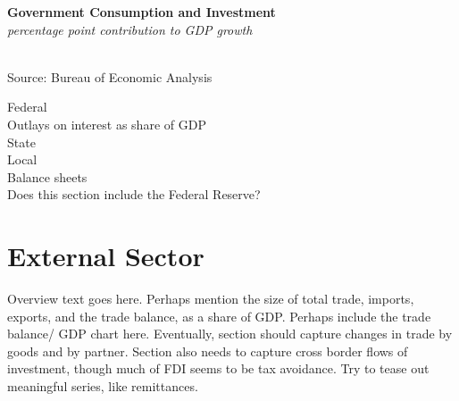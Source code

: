 \documentclass{report}
\makeatletter
\newcommand*\short[1]{\expandafter\@gobbletwo\number\numexpr#1\relax}
\newcommand{\sbar}[4]{
		\addplot[ybar stacked, bar width=2.7pt, draw opacity=0, fill=#1] 
			table [x=#2, y=#3, col sep=comma]{#4};}
\newcommand{\dateaxisticks}{
		date coordinates in=x, axis line style={draw=none},
		xmax={2019-10-01},
		max space between ticks=40,	    
		xtick={{1990-01-01}, {1992-01-01}, {1994-01-01}, 
			{1996-01-01}, {1998-01-01}, {2000-01-01}, 
			{2002-01-01}, {2004-01-01}, {2006-01-01},
			{2008-01-01}, {2010-01-01}, {2012-01-01}, {2014-01-01},
		    {2016-01-01}, {2018-01-01}},
		minor xtick={{1989-01-01}, {1991-01-01}, {1993-01-01},
			{1995-01-01}, {1997-01-01}, {1999-01-01}, 
			{2001-01-01}, {2003-01-01}, {2005-01-01}, {2007-01-01},
		    {2009-01-01}, {2011-01-01}, {2013-01-01}, {2015-01-01},
		    {2017-01-01}, {2019-01-01}},
		enlarge y limits={0.04}, enlarge x limits={0.01},
		}
\newcommand{\bbar}[2]{extra #1 ticks = {{#2}}, extra #1 tick labels = ,
		extra #1 tick style = {grid=major, grid style={thick, black!25}},}
\newcommand{\rbars}{
		\fill[color=black!10] (axis cs:{1990-07-01},\pgfkeysvalueof{/pgfplots/ymin}) rectangle 
			(axis cs:{1991-03-01}, \pgfkeysvalueof{/pgfplots/ymax});
		\fill[color=black!10] (axis cs:{2007-12-01},\pgfkeysvalueof{/pgfplots/ymin}) rectangle 
			(axis cs:{2009-07-01}, \pgfkeysvalueof{/pgfplots/ymax});
		\fill[color=black!10] (axis cs:{2001-03-01},\pgfkeysvalueof{/pgfplots/ymin}) rectangle 
			(axis cs:{2001-11-01}, \pgfkeysvalueof{/pgfplots/ymax});}
\makeatother
\begin{document}
{{{\begin{minipage}{0.76\textwidth}
\noindent \normalsize \textbf{Government Consumption and Investment}\\
\footnotesize{\textit{percentage point contribution to GDP growth}}\\
\noindent \hspace*{-2mm} \\
\footnotesize{Source: Bureau of Economic Analysis}
\vspace{10mm}

\normalsize

Federal\\

\hspace{5mm} Outlays on interest as share of GDP \\

State \\

Local \\

Balance sheets \\

Does this section include the Federal Reserve?\\

\end{minipage}


\newpage
\begin{minipage}{0.76\textwidth}
\section*{\color{darkgray}\LARGE \seriffont External Sector}

\small

Overview text goes here. Perhaps mention the size of total trade, imports, exports, and the trade balance, as a share of GDP. Perhaps include the trade balance/ GDP chart here. Eventually, section should capture changes in trade by goods and by partner. Section also needs to capture cross border flows of investment, though much of FDI seems to be tax avoidance. Try to tease out meaningful series, like remittances. \\


\end{minipage}}}}
\end{document}
